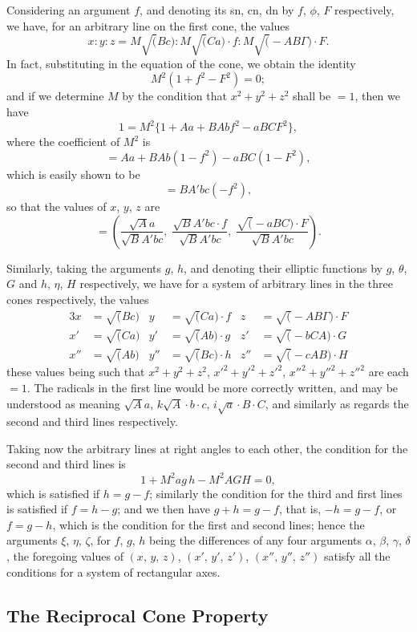 \documentclass[11pt,a4paper]{book}
\begin{document}
Considering an argument $f$, and denoting its sn, cn, dn by $f$, $\phi$, $F$ respectively, we have, for an arbitrary line on the first cone, the values
\[
x : y : z = M\surd(Bc) : M\surd(Ca)\cdot f : M\surd(-AB\Gamma)\cdot F.
\]
In fact, substituting in the equation of the cone, we obtain the identity
\[
M^{2}(1 + f^{2} - F^{2}) = 0;
\]
and if we determine $M$ by the condition that $x^{2} + y^{2} + z^{2}$ shall be $=1$, then we have
\[
1 = M^{2}\{1 + Aa + BAbf^{2} - aBCF^{2}\},
\]
where the coefficient of $M^{2}$ is
\[
= Aa + BAb(1 - f^{2}) - aBC(1 - F^{2}),
\]
which is easily shown to be
\[
= BA'bc(-f^{2}),
\]
so that the values of $x$, $y$, $z$ are
\[
= \left(\frac{\surd Aa}{\surd BA'bc},\; \frac{\surd BA'bc\cdot f}{\surd BA'bc},\; \frac{\surd(-aBC)\cdot F}{\surd BA'bc}\right).
\]

Similarly, taking the arguments $g$, $h$, and denoting their elliptic functions by $g$, $\theta$, $G$ and $h$, $\eta$, $H$ respectively, we have for a system of arbitrary lines in the three cones respectively, the values
\begin{alignat*}{3}
x &= \surd(Bc) & y &= \surd(Ca)\cdot f & z &= \surd(-AB\Gamma)\cdot F \\
x' &= \surd(Ca) & y' &= \surd(Ab)\cdot g & z' &= \surd(-bCA)\cdot G \\
x'' &= \surd(Ab) & y'' &= \surd(Bc)\cdot h & z'' &= \surd(-cAB)\cdot H
\end{alignat*}
these values being such that $x^{2}+y^{2}+z^{2}$, $x'^{2}+y'^{2}+z'^{2}$, $x''^{2}+y''^{2}+z''^{2}$ are each $=1$. The radicals in the first line would be more correctly written, and may be understood as meaning $\surd Aa$, $k\surd A\cdot b\cdot c$, $i\surd a\cdot B\cdot C$, and similarly as regards the second and third lines respectively.

Taking now the arbitrary lines at right angles to each other, the condition for the second and third lines is
\[
1 + M^{2}ag\,h - M^{2}AGH = 0,
\]
which is satisfied if $h = g - f$; similarly the condition for the third and first lines is satisfied if $f = h - g$; and we then have $g + h = g - f$, that is, $-h = g - f$, or $f = g - h$, which is the condition for the first and second lines; hence the arguments $\xi$, $\eta$, $\zeta$, for $f$, $g$, $h$ being the differences of any four arguments $\alpha$, $\beta$, $\gamma$, $\delta$, the foregoing values of $(x,\, y,\, z)$, $(x',\, y',\, z')$, $(x'',\, y'',\, z'')$ satisfy all the conditions for a system of rectangular axes.

\subsection*{The Reciprocal Cone Property}
\end{document}
